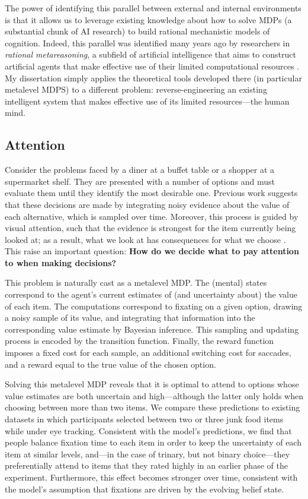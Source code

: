 \documentclass[12pt,a4paperpaper,]{article}
\begin{document}
The power of identifying this parallel between external and internal environments is that it allows us to leverage existing knowledge about how to solve MDPs (a substantial chunk of AI research) to build rational mechanistic models of cognition. Indeed, this parallel was identified many years ago by researchers in \emph{rational metareasoning}, a subfield of artificial intelligence that aims to construct artificial agents that make effective use of their limited computational resources \citep{russell1991principles,hay2016principles}. My dissertation simply applies the theoretical tools developed there (in particular metalevel MDPS) to a different problem: reverse-engineering an existing intelligent system that makes effective use of its limited resources---the human mind.

\subsection{Attention}

Consider the problems faced by a diner at a buffet table or a shopper at a supermarket shelf. They are presented with a number of options and must evaluate them until they identify the most desirable one. Previous work suggests that these decisions are made by integrating noisy evidence about the value of each alternative, which is sampled over time. Moreover, this process is guided by visual attention, such that the evidence is strongest for the item currently being looked at; as a result, what we look at has consequences for what we choose \citep{krajbich2010visual}. This raise an important question: \textbf{How do we decide what to pay attention to when making
decisions?}

This problem is naturally cast as a metalevel MDP. The (mental) states correspond to the agent's current estimates of (and uncertainty about) the value of each item. The computations correspond to fixating on a given option, drawing a noisy sample of its value, and integrating that information into the corresponding value estimate by Bayesian inference. This sampling and updating process is encoded by the transition function. Finally, the reward function imposes a fixed cost for each sample, an additional switching cost for saccades, and a reward equal to the true value of the chosen option.

Solving this metalevel MDP reveals that it is optimal to attend to options whose value estimates are both uncertain and high---although the latter only holds when choosing between more than two items. We compare these predictions to existing datasets in which participants selected between two or three junk food items while under eye tracking. Consistent with the model's predictions, we find that people balance fixation time to each item in order to keep the uncertainty of each item at similar levels, and---in the case of trinary, but not binary choice---they preferentially attend to items that they rated highly in an earlier phase of the experiment. Furthermore, this effect becomes stronger over time, consistent with the model's assumption that fixations are driven by the evolving belief state.
\end{document}
